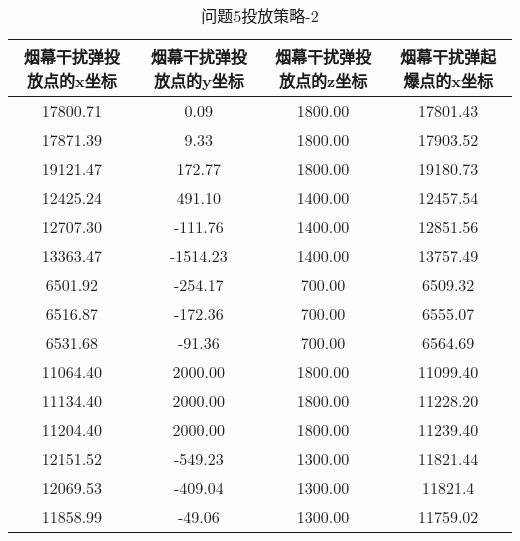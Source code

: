 \documentclass[../main.tex]{subfiles}
\begin{document}
\begin{table}[H]
\caption{问题5投放策略-2}
\label{tab:031} 
\centering
\begin{small}
\begin{tabular}{cccc}
\toprule[1.5pt]
烟幕干扰弹投放点的x坐标& 烟幕干扰弹投放点的y坐标    &烟幕干扰弹投放点的z坐标 & 烟幕干扰弹起爆点的x坐标\\
\midrule[1pt]
    17800.71 & 0.09    & 1800.00 & 17801.43 \\
    17871.39 & 9.33    & 1800.00 & 17903.52 \\
    19121.47 & 172.77  & 1800.00 & 19180.73 \\
    12425.24 & 491.10  & 1400.00 & 12457.54 \\
    12707.30 & -111.76 & 1400.00 & 12851.56 \\
    13363.47 & -1514.23& 1400.00 & 13757.49 \\
    6501.92  & -254.17 & 700.00  & 6509.32 \\
    6516.87  & -172.36 & 700.00  & 6555.07 \\
    6531.68  & -91.36  & 700.00  & 6564.69 \\
    11064.40 & 2000.00 & 1800.00 & 11099.40 \\
    11134.40 & 2000.00 & 1800.00 & 11228.20 \\
    11204.40 & 2000.00 & 1800.00 & 11239.40 \\
    12151.52 & -549.23 & 1300.00 & 11821.44 \\
    12069.53 & -409.04 & 1300.00 & 11821.4 \\
    11858.99 & -49.06  & 1300.00 & 11759.02 \\
\bottomrule[1.5pt]
\end{tabular}
\end{small}
\end{table}
\end{document}

